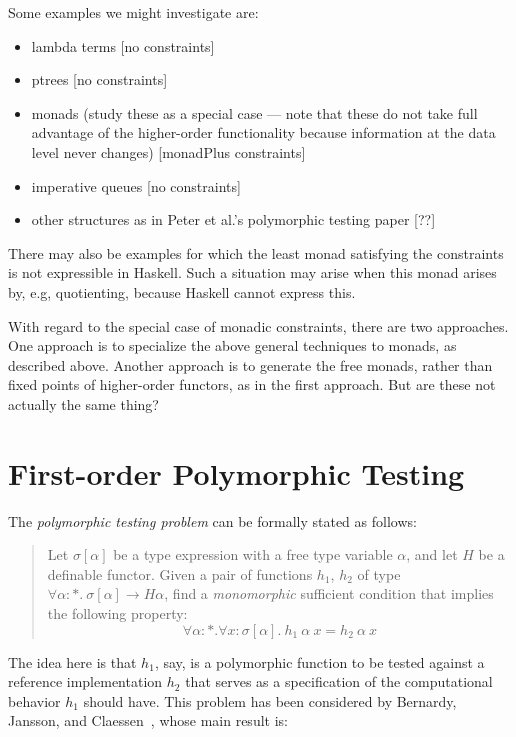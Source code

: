 \documentclass{article}[12 pt]
\newcommand{\pattynote}[1]{\todo[inline, color=green!40]{#1}}
\theoremstyle{problemstyle}
\begin{document}
Some examples we might investigate are:
\begin{itemize}
\item lambda terms [no constraints]
\item ptrees [no constraints]
\item monads (study these as a special case --- note that these do not
  take full advantage of the higher-order functionality because
  information at the data level never changes) [monadPlus constraints]
\item imperative queues [no constraints]
\item other structures as in Peter et al.'s polymorphic testing paper [??]
\end{itemize}
There may also be examples for which the least monad satisfying the
constraints is not expressible in Haskell. Such a situation may arise
when this monad arises by, e.g, quotienting, because Haskell cannot
express this.

With regard to the special case of monadic constraints, there are two
approaches. One approach is to specialize the above general techniques
to monads, as described above. Another approach is to generate the free
monads, rather than fixed points of higher-order functors, as in the
first approach. But are these not actually the same thing?

\section{First-order Polymorphic Testing}

The \pattynote{first-order} {\em polymorphic testing problem} can be
formally stated as follows:

\begin{verse}\label{problem:poly-testing}
  \hspace*{0.2in}Let $\sigma[\alpha]$ be a type expression with a free
  type variable $\alpha$, and let $H$ be a definable functor. Given a
  pair of functions $h_1$, $h_2$ of type $\forall \alpha :
  *.~\sigma[\alpha] \to H\alpha$, find a \emph{monomorphic} sufficient
  condition that implies the following property:
  \begin{equation}
    \label{eq:problem}
    \forall \alpha : *. \forall x : \sigma[\alpha].~h_1~\alpha~x = h_2~\alpha~x
  \end{equation}
\end{verse}

\noindent
The idea here is that $h_1$, say, is a polymorphic function to be
tested against a reference implementation $h_2$ that serves as a
specification of the computational behavior $h_1$ should have.  This
problem has been considered by Bernardy, Jansson, and
Claessen~\cite{bjc10}, whose main result is:
\end{document}
